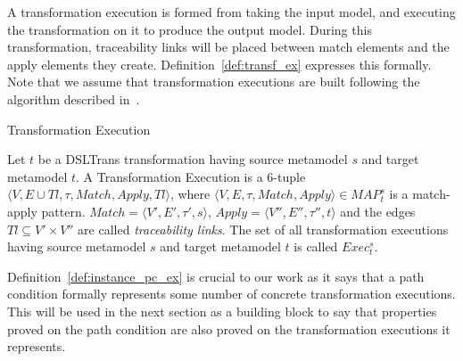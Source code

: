 
A transformation execution is formed from taking the input model, and executing
the transformation on it to produce the output model. During this
transformation, traceability links will be placed between match elements and the
apply elements they create. Definition~\ref{def:transf_ex} expresses this
formally. Note that we assume that transformation executions are built following
the algorithm described in~\cite{DBLP:conf/sle/BarrocaLAFS10}.

\begin{definition}{Transformation Execution}
\label{def:transf_ex}

Let $t$ be a DSLTrans transformation having source metamodel $s$ and target
metamodel $t$. A Transformation Execution is a 6-tuple $\langle V,E\cup
Tl,\tau,Match,Apply,Tl\rangle$, where $\langle V,E,\tau,Match,Apply\rangle \in
MAP^{s}_{t}$ is a match-apply pattern. $Match=\langle V',E', \tau',s\rangle$,
$Apply=\langle V'',E'', \tau'',t\rangle$ and the edges $Tl\subseteq V'\times
V''$ are called \emph{traceability links}. The set of all transformation
executions having source metamodel $s$ and target metamodel $t$ is called
$Exec^{s}_{t}$.
\end{definition}

Definition~\ref{def:instance_pc_ex} is crucial to our work as it says that a path condition formally represents some number of concrete transformation executions. This will be used in the next section as a building block to say that properties proved on the path condition are also proved on the transformation executions it represents.  

